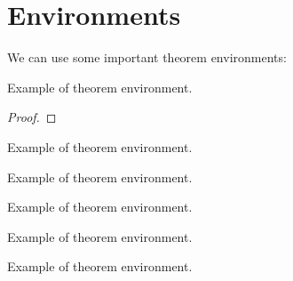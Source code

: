 \documentclass[twoside,openany,12pt]{beautynote}
\begin{document}
\section{Environments}
We can use some important theorem environments:
\begin{theorem}[Theorem]\label{thm:example-1}
    Example of theorem environment.
\end{theorem}
\begin{proof}
    
\end{proof}
    
\begin{lemma}[Lemma]\label{thm:example-2}
    Example of theorem environment.
\end{lemma}
\begin{solution}
    
\end{solution}
    
\begin{definition}[Definition]\label{thm:example-3}
    Example of theorem environment.
\end{definition}
\begin{proposition}[Proposition]\label{thm:example-4}
    Example of theorem environment.
\end{proposition}
\begin{problem}[Problem]\label{thm:example-5}
    Example of theorem environment.
\end{problem}
\begin{remark}[Remark]
    Example of theorem environment.
\end{remark}

\clearpage
\pagestyle{\auxsettings}
\end{document}
